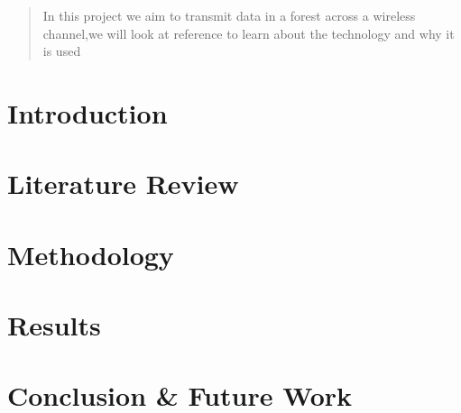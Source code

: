 \documentclass[11pt]{report}
\begin{document}


\newpage
\tableofcontents
\listoffigures
\listoftables
\lstlistoflistings
\newpage

\begin{abstract}
  In this project we aim to transmit data in a forest across a wireless channel,we will look at reference to learn about the technology and why it is  used 
\end{abstract}
\chapter{Introduction}

% 
% 		


\chapter{Literature Review}

\chapter{Methodology}

\chapter{Results}



\chapter{Conclusion \& Future Work }


\newpage
{}


\end{document}

